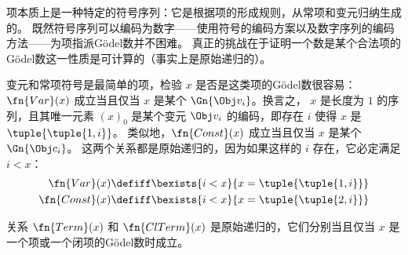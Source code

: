 \documentclass[../../../include/open-logic-section]{subfiles}
\begin{document}

\begin{explain}
项本质上是一种特定的符号序列：它是根据项的形成规则，从常项和变元归纳生成的。
既然符号序列可以编码为数字——使用符号的编码方案以及数字序列的编码方法——为项指派Gödel数并不困难。
真正的挑战在于证明一个数是某个合法项的Gödel数这一性质是可计算的（事实上是原始递归的）。
\end{explain}

变元和常项符号是最简单的项，检验 $x$ 是否是这类项的Gödel数很容易：
$\fn{Var}(x)$ 成立当且仅当 $x$ 是某个 $\Gn{\Obj v_i}$。换言之，
$x$ 是长度为 $1$ 的序列，且其唯一元素 $(x)_0$ 是某个变元 $\Obj v_i$ 的编码，即存在 $i$ 使得 $x$ 是 $\tuple{\tuple{1, i}}$。
类似地，$\fn{Const}(x)$ 成立当且仅当 $x$ 是某个 $\Gn{\Obj c_i}$。
这两个关系都是原始递归的，因为如果这样的 $i$ 存在，它必定满足 $i < x$：
\begin{align*}
  \fn{Var}(x) & \defiff \bexists{i<x}{x = \tuple{\tuple{1, i}}}\\
  \fn{Const}(x) & \defiff \bexists{i<x}{x = \tuple{\tuple{2, i}}}
\end{align*}

\begin{prop}
关系 $\fn{Term}(x)$ 和 $\fn{ClTerm}(x)$ 是原始递归的，它们分别当且仅当 $x$
是一个项或一个闭项的Gödel数时成立。
\end{prop}
\end{document}
